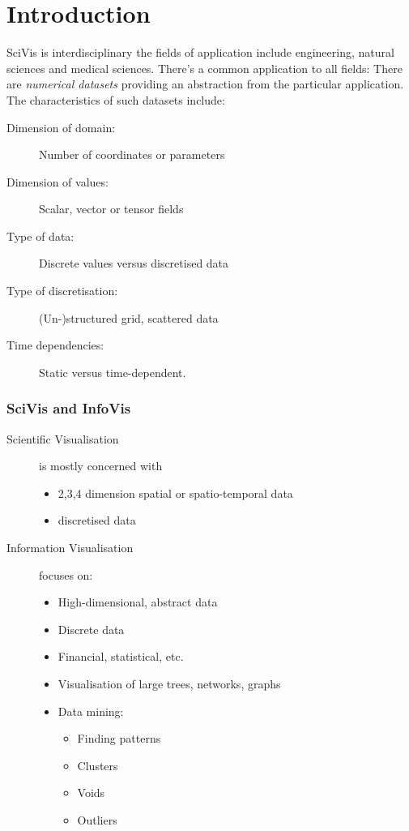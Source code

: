 \section{Introduction}

SciVis is interdisciplinary the fields of application include engineering, natural sciences and medical sciences.   There's a common application to all fields: 
There are \emph{numerical datasets} providing an abstraction from the particular application. The characteristics of such datasets include:
\begin{description}
\item[Dimension of domain:] Number of coordinates or parameters
\item[Dimension of values:] Scalar, vector or tensor fields
\item[Type of data:] Discrete values versus discretised data
\item[Type of discretisation:] (Un-)structured grid, scattered data
\item[Time dependencies:] Static versus time-dependent.
\end{description}

\subsubsection{SciVis and InfoVis}
\begin{description}
    \item[Scientific Visualisation] is mostly concerned with 
        \begin{itemize}
            \item 2,3,4 dimension spatial or spatio-temporal data
            \item discretised data
        \end{itemize}
    \item[Information Visualisation] focuses on:
        \begin{itemize}
            \item High-dimensional, abstract data
            \item Discrete data
            \item Financial, statistical, etc.
            \item Visualisation of large trees, networks, graphs
            \item Data mining:
                \begin{itemize}
                    \item Finding patterns
                    \item Clusters
                    \item Voids
                    \item Outliers
                \end{itemize}
                
        \end{itemize}

\end{description}

